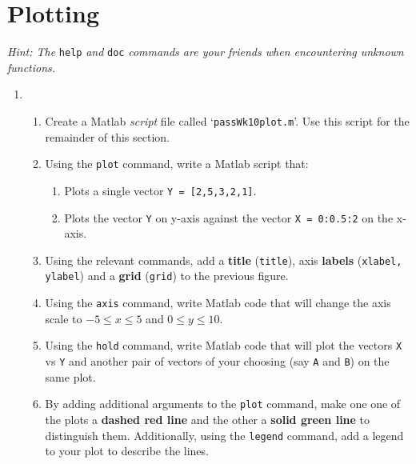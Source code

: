 \documentclass{pass}
\begin{document}
\section*{Plotting}
\textit{Hint: The} \texttt{help} \textit{and} \texttt{doc} \textit{commands are your friends when encountering unknown functions.}
\begin{enumerate}[resume]
	\item 
	\begin{enumerate}
		\item Create a Matlab \textit{script} file called `\texttt{passWk10plot.m}'. Use this script for the remainder of this section.\\
		
		\item Using the \texttt{plot} command, write a Matlab script that:
		\begin{enumerate}
			\item Plots a single vector \texttt{Y = [2,5,3,2,1]}.
			\item Plots the vector \texttt{Y} on y-axis against the vector \texttt{X = 0:0.5:2} on the x-axis.\\
		\end{enumerate}
		
		\item Using the relevant commands, add a \textbf{title} (\texttt{title}), axis \textbf{labels} (\texttt{xlabel, ylabel}) and a \textbf{grid} (\texttt{grid}) to the previous figure.\\
		
		\item Using the \texttt{axis} command, write Matlab code that will change the axis scale to $-5 \leq x \leq 5$ and $0 \leq y \leq 10$.\\
		
		\item Using the \texttt{hold} command, write Matlab code that will plot the vectors \texttt{X} vs \texttt{Y} and another pair of vectors of your choosing (say \texttt{A} and \texttt{B}) on the same plot.\\
		
		\item By adding additional arguments to the \texttt{plot} command, make one one of the plots a \textbf{dashed red line} and the other a \textbf{solid green line} to distinguish them. Additionally, using the \texttt{legend} command, add a legend to your plot to describe the lines.
	\end{enumerate}
\end{enumerate}
\end{document}

